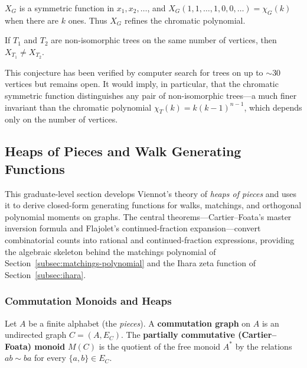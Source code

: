 \begin{theorem}[Stanley]
$X_G$ is a symmetric function in $x_1, x_2, \ldots$, and $X_G(1, 1, \ldots, 1, 0, 0, \ldots) = \chi_G(k)$
when there are $k$ ones. Thus $X_G$ refines the chromatic polynomial.
\end{theorem}

\begin{conjecture}
If $T_1$ and $T_2$ are non-isomorphic trees on the same number of
vertices, then $X_{T_1} \ne X_{T_2}$.
\end{conjecture}

This conjecture has been verified by computer search for trees on up
to $\sim 30$ vertices but remains open. It would imply, in particular,
that the chromatic symmetric function distinguishes any pair of
non-isomorphic trees---a much finer invariant than the chromatic
polynomial $\chi_T(k) = k(k - 1)^{n - 1}$, which depends only on the
number of vertices.

\subsection{Heaps of Pieces and Walk Generating Functions}\label{subsec:heaps}

This graduate-level section develops Viennot's theory of \emph{heaps
of pieces} and uses it to derive closed-form generating functions for
walks, matchings, and orthogonal polynomial moments on graphs. The
central theorems---Cartier--Foata's master inversion formula and
Flajolet's continued-fraction expansion---convert combinatorial counts
into rational and continued-fraction expressions, providing the
algebraic skeleton behind the matchings polynomial of Section~\ref{subsec:matchings-polynomial} and the
Ihara zeta function of Section~\ref{subsec:ihara}.

\subsubsection{Commutation Monoids and Heaps}

\begin{definition}
\label{def:commgraph}
Let $A$ be a finite alphabet (the \emph{pieces}). A \textbf{commutation
graph} on $A$ is an undirected graph $C = (A, E_C)$. The
\textbf{partially commutative (Cartier--Foata) monoid} $M(C)$ is the
quotient of the free monoid $A^*$ by the relations
$ab \sim ba$ for every $\{a, b\} \in E_C$.
\end{definition}

